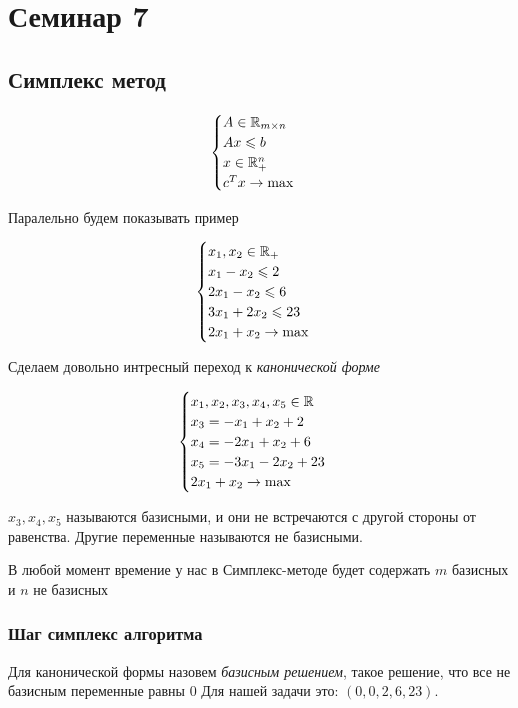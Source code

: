 \section{Семинар 7}

\subsection{Симплекс метод}

\[
    \begin{cases}
        A \in \mathbb{R}_{m \times n}\\
        A x \leqslant b\\
        x \in \mathbb{R}^n_+\\
        c^T x \to \max
    \end{cases}    
\]

Паралельно будем показывать пример

\[
    \begin{cases}
        x_1, x_2 \in \mathbb{R}_+\\
        x_1 - x_2 \leqslant 2\\
        2x_1 - x_2 \leqslant 6\\
        3x_1 + 2 x_2 \leqslant 23\\
        2x_1 + x_2 \to \max
    \end{cases}  
\]

Сделаем довольно интресный переход к \emph{канонической форме}

\[
    \begin{cases}
        x_1, x_2, x_3, x_4, x_5 \in \mathbb{R}\\
        x_3 = -x_1 + x_2 + 2\\
        x_4 = -2x_1 + x_2 + 6\\
        x_5 = -3x_1 - 2x_2 + 23\\
        2 x_1 + x_2 \to \max
    \end{cases}    
\]

$x_3, x_4, x_5$ называются базисными, и они не встречаются с другой стороны от равенства.
Другие переменные называются не базисными.

В любой момент времение у нас в Симплекс-методе будет содержать $m$ базисных и $n$ не базисных

\subsubsection{Шаг симплекс алгоритма}

Для канонической формы назовем \emph{базисным решением}, такое решение, что все не базисным переменные равны 0
Для нашей задачи это: $\left(0, 0, 2, 6, 23\right)$.

